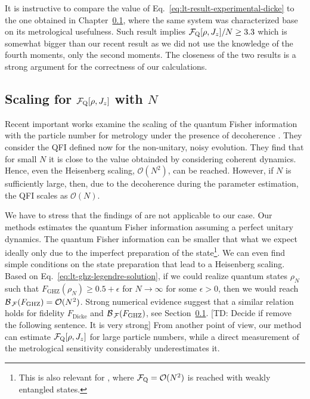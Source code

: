 It is instructive to compare the value of Eq.~\eqref{eq:lt-result-experimental-dicke} to the one obtained in Chapter~\ref{}, where the same system was characterized base on its metrological usefulness.
Such result implies $\mathcal{F}_{\textnormal{Q}}[\rho,J_z]/N\geq3.3$ which is somewhat bigger than our recent result as we did not use the knowledge of the fourth moments, only the second moments.
The closeness of the two results is a strong argument for the correctness of our calculations.

\subsection{Scaling for $\mathcal{F}_{\textnormal{Q}}[\rho,J_z]$ with $N$}

Recent important works examine the scaling of the quantum Fisher information with the particle number for metrology under the presence of decoherence \citep{Escher2011, Demkowicz2012}.
They consider the QFI defined now for the non-unitary, noisy evolution.
They find that for small $N$ it is close to the value obtainded by considering coherent dynamics.
Hence, even the Heisenberg scaling, $\mathcal{O}(N^2)$, can be reached.
However, if $N$ is sufficiently large, then, due to the decoherence during the parameter estimation, the QFI scales as $\mathcal{O}(N)$.

We have to stress that the findings of \citep{Escher2011, Demkowicz2012} are not applicable to our case.
Our methods estimates the quantum Fisher information assuming a perfect unitary dynamics.
The quantum Fisher information can be smaller that what we expect ideally only due to the imperfect preparation of the state\footnote{This is also relevant for \citep{Augusiak2015}, where $\mathcal{F}_{\textnormal{Q}}=\mathcal{O}(N^2)$ is reached with weakly entangled states.}.
We can even find simple conditions on the state preparation that lead to a Heisenberg scaling.
Based on Eq.~\eqref{eq:lt-ghz-legendre-solution}, if we could realize quantum states $\rho_N$ such that $F_{\text{GHZ}}(\rho_N)\geq0.5+\epsilon$ for $N\rightarrow\infty$ for some $\epsilon>0$, then we would reach $\mathcal{B}_{\, \mathcal{F} }(F_{\text{GHZ}}) = \mathcal{O}(N^2)$.
Strong numerical evidence suggest that a similar relation holds for fidelity $F_{\text{Dicke}}$ and $\mathcal{B}_{\, \mathcal{F} }(F_{\text{GHZ}})$, see Section~\ref{}.
[TD: Decide if remove the following sentence. It is very strong]
From another point of view, our method can estimate $\mathcal{F}_{\textnormal{Q}}[\rho,J_z]$ for large particle numbers, while a direct measurement of the metrological sensitivity considerably underestimates it.
